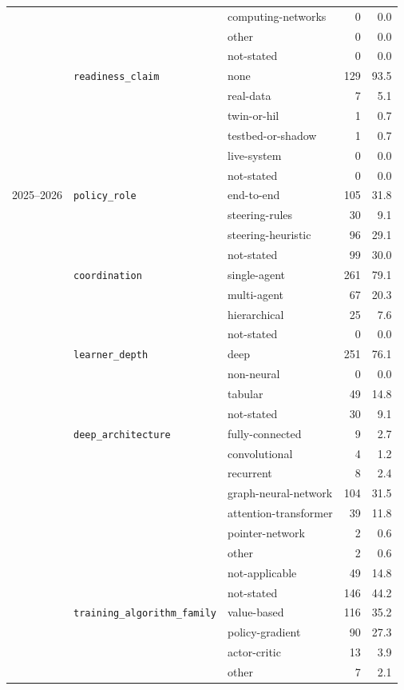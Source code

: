 \begin{longtable}{lllr@{\hspace{1.0em}}r}
 &  & computing-networks & 0 & 0.0 \\
 &  & other & 0 & 0.0 \\
 &  & not-stated & 0 & 0.0 \\
 & \texttt{readiness\_claim} & none & 129 & 93.5 \\
 &  & real-data & 7 & 5.1 \\
 &  & twin-or-hil & 1 & 0.7 \\
 &  & testbed-or-shadow & 1 & 0.7 \\
 &  & live-system & 0 & 0.0 \\
 &  & not-stated & 0 & 0.0 \\
2025--2026 & \texttt{policy\_role} & end-to-end & 105 & 31.8 \\
 &  & steering-rules & 30 & 9.1 \\
 &  & steering-heuristic & 96 & 29.1 \\
 &  & not-stated & 99 & 30.0 \\
 & \texttt{coordination} & single-agent & 261 & 79.1 \\
 &  & multi-agent & 67 & 20.3 \\
 &  & hierarchical & 25 & 7.6 \\
 &  & not-stated & 0 & 0.0 \\
 & \texttt{learner\_depth} & deep & 251 & 76.1 \\
 &  & non-neural & 0 & 0.0 \\
 &  & tabular & 49 & 14.8 \\
 &  & not-stated & 30 & 9.1 \\
 & \texttt{deep\_architecture} & fully-connected & 9 & 2.7 \\
 &  & convolutional & 4 & 1.2 \\
 &  & recurrent & 8 & 2.4 \\
 &  & graph-neural-network & 104 & 31.5 \\
 &  & attention-transformer & 39 & 11.8 \\
 &  & pointer-network & 2 & 0.6 \\
 &  & other & 2 & 0.6 \\
 &  & not-applicable & 49 & 14.8 \\
 &  & not-stated & 146 & 44.2 \\
 & \texttt{training\_algorithm\_family} & value-based & 116 & 35.2 \\
 &  & policy-gradient & 90 & 27.3 \\
 &  & actor-critic & 13 & 3.9 \\
 &  & other & 7 & 2.1 \\

\end{longtable}
